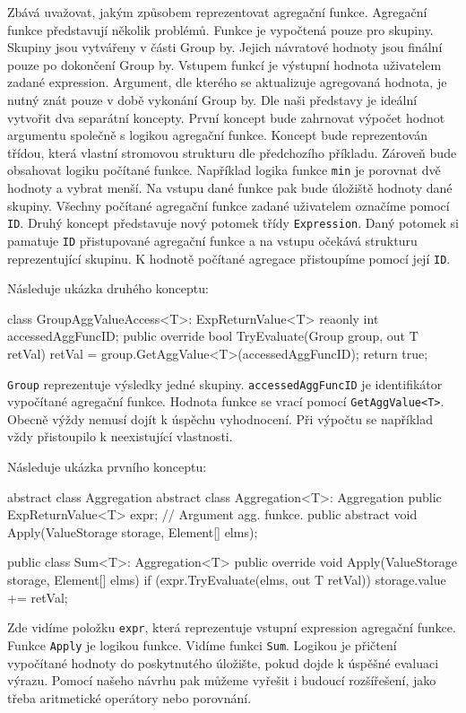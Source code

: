 Zbává uvažovat, jakým způsobem reprezentovat agregační funkce.
Agregační funkce představují několik problémů.
Funkce je vypočtená pouze pro skupiny. 
Skupiny jsou vytvářeny v části Group by.
Jejich návratové hodnoty jsou finální pouze po dokončení Group by. 
Vstupem funkcí je výstupní hodnota uživatelem zadané expression.
Argument, dle kterého se aktualizuje agregovaná hodnota, je nutný znát pouze v době vykonání Group by.
Dle naši představy je ideální vytvořit dva separátní koncepty.
První koncept bude zahrnovat výpočet hodnot argumentu společně s logikou agregační funkce.
Koncept bude reprezentován třídou, která vlastní stromovou strukturu dle předchozího příkladu.
Zároveň bude obsahovat logiku počítané funkce.
Například logika funkce \verb+min+ je porovnat dvě hodnoty a vybrat menší.
Na vstupu dané funkce pak bude úložiště hodnoty dané skupiny.
Všechny počítané agregační funkce zadané uživatelem označíme pomocí \verb+ID+.
Druhý koncept představuje nový potomek třídy \texttt{Expression}.
Daný potomek si pamatuje \verb+ID+ přistupované agregační funkce a na vstupu očekává strukturu reprezentující skupinu.
K hodnotě počítané agregace přistoupíme pomocí její \verb+ID+.

Následuje ukázka druhého konceptu:
\begin{code}
class GroupAggValueAccess<T>: ExpReturnValue<T> {
  reaonly int accessedAggFuncID; 
  public override bool TryEvaluate(Group group, out T retVal) {
    retVal = group.GetAggValue<T>(accessedAggFuncID);
    return true; }}
\end{code}
\verb+Group+ reprezentuje výsledky jedné skupiny.
\verb+accessedAggFuncID+ je identifikátor vypočítané agregační funkce.
Hodnota funkce se vrací pomocí \verb+GetAggValue<T>+.
Obecně výždy nemusí dojít k úspěchu vyhodnocení.
Při výpočtu se například vždy přistoupilo k neexistující vlastnosti.

\clearpage
Následuje ukázka prvního konceptu:
\begin{code}
abstract class Aggregation { }
abstract class Aggregation<T>: Aggregation {
  public ExpReturnValue<T> expr; // Argument agg. funkce.
  public abstract void Apply(ValueStorage storage, Element[] elms);
}

public class Sum<T>: Aggregation<T>{
  public override void Apply(ValueStorage storage, Element[] elms) {
    if (expr.TryEvaluate(elms, out T retVal)) {
      storage.value += retVal;
    }
  }
}
\end{code}
Zde vidíme položku \verb+expr+, která reprezentuje vstupní expression agregační funkce.
Funkce \verb+Apply+ je logikou funkce. 
Vidíme funkci \verb+Sum+. 
Logikou je přičtení vypočítané hodnoty do poskytnutého úložište, pokud dojde k úspěšné evaluaci výrazu.
Pomocí našeho návrhu pak můžeme vyřešit i budoucí rozšířešení, jako třeba aritmetické operátory nebo porovnání.

